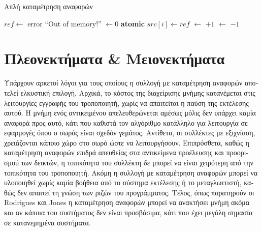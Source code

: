 \begin{greek}
\begin{algorithm}[H]
  \caption{Απλή καταμέτρηση αναφορών}
  \label{alg:refcnt_1}
  \begin{algorithmic}[1]
      \State $ref \gets$ 
        \State error ``Out of memory!''
      \EndIf
      \State {} $\gets 0$
      \State {}
    \EndFunction
    \Statex
      \State \textbf{atomic}
      \State {}
      \State {}
      \State $src[i] \gets ref$
    \EndProcedure
    \Statex
        \State {} $\gets$  $+1$
      \EndIf
    \EndProcedure
    \Statex
        \State {} $\gets$  $-1$
            \State {}
          \EndFor
          \State {}
        \EndIf
      \EndIf
    \EndProcedure
  \end{algorithmic}
\end{algorithm}

\section{Πλεονεκτήματα \& Μειονεκτήματα}
Υπάρχουν αρκετοί λόγοι για τους οποίους η συλλογή με καταμέτρηση
αναφορών αποτελεί ελκυστική επιλογή. Αρχικά, το κόστος της
διαχείρισης μνήμης κατανέμεται στις λειτουργίες εγγραφής του
τροποποιητή, χωρίς να απαιτείται η παύση της εκτέλεσης αυτού.
Η μνήμη ενός αντικειμένου απελευθερώνεται αμέσως μόλις δεν
υπάρχει καμία αναφορά προς αυτό, κάτι που καθιστά τον αλγόριθμο
κατάλληλο για λειτουργία σε εφαρμογές όπου ο σωρός είναι
σχεδόν γεμάτος. Αντίθετα, οι συλλέκτες με εξιχνίαση, χρειάζονται
κάποιο χώρο στο σωρό ώστε να λειτουργήσουν. Επιπρόσθετα,
καθώς η καταμέτρηση αναφορών επιδρά απευθείας στα αντικείμενα
προέλευσης και προορισμού των δεικτών, η τοπικότητα του συλλέκτη
δε μπορεί να είναι χειρότερη από την τοπικότητα του τροποποιητή.
Ακόμη η συλλογή με καταμέτρηση αναφορών μπορεί να υλοποιηθεί
χωρίς καμία βοήθεια από το σύστημα εκτέλεσης ή το μεταγλωττιστή,
καθώς δεν απαιτεί τη γνώση των ριζών του προγράμματος. Τέλος,
όπως παρατηρούν οι Rodrigues και Jones \cite{DBLP:conf/wdag/RodriguesJ96}
η καταμέτρηση αναφορών μπορεί να ανακτήσει μνήμη ακόμα και
αν κάποια του συστήματος δεν είναι προσβάσιμα, κάτι που έχει
μεγάλη σημασία σε κατανεμημένα συστήματα.


\end{greek}
